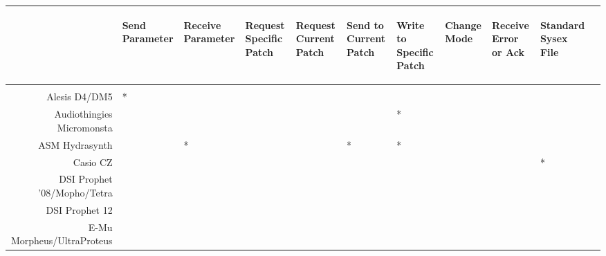\documentclass{article}
\begin{document}
\newcommand\samefootnote{\addtocounter{footnote}{-1}\footnotemark}
\newcommand\backfootnote[1]{\addtocounter{footnote}{-#1}\footnotemark\addtocounter{footnote}{#1}\addtocounter{footnote}{-1}}
\newcommand\cm{\checkmark}

\begin{table}[p]
\vspace{5em}
\begin{center}
{\footnotesize
\begin{tabular}{rllllllllll}
&
\begin{sideways}Send Parameter\end{sideways}&
\begin{sideways}Receive Parameter\end{sideways}&
\begin{sideways}Request Specific Patch\end{sideways}&
\begin{sideways}Request Current Patch\end{sideways}&
\begin{sideways}Send to Current Patch\end{sideways}&
\begin{sideways}Write to Specific Patch\end{sideways}&
\begin{sideways}Change Mode\end{sideways}&
\begin{sideways}Receive Error or Ack\end{sideways}&
\begin{sideways}Standard Sysex File\end{sideways}\\[0.5em]
\hline\\[-0.5em]
Alesis D4/DM5&{\cm}*&&{\cm}&&{\cm}&{\cm}& & &{\cm}            \\
Audiothingies Micromonsta&{\cm}&{\cm}&&&&{\cm}*& & &{\cm}            \\
ASM Hydrasynth&{\cm}&{\cm}*&\cm&&{\cm}*&{\cm}*& & &{\cm}            \\
Casio CZ&&&{\cm}&{\cm}&{\cm}&{\cm}& & &{\cm}*            \\
DSI Prophet '08/Mopho/Tetra&{\cm}&{\cm}&{\cm}&{\cm}&{\cm}&{\cm}& & &{\cm}            \\
DSI Prophet 12&{\cm}&{\cm}&{\cm}&{\cm}&{\cm}&{\cm}& & &{\cm}            \\
E-Mu Morpheus/UltraProteus&{\cm}& &{\cm}& & &{\cm}& & &{\cm}            \\

\end{tabular}}
\end{center}
\end{table}
\end{document}
